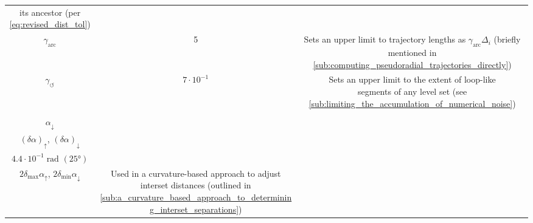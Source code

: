 \begin{table}[htpb]
\begin{tabular}{ccc}
{        its ancestor (per \cref{eq:revised_dist_tol})}
        \\[9pt]
        $\gamma_{\text{arc}}$ %
        & 5 %
        & \makecell{Sets an upper limit to trajectory lengths as \\
        $\gamma_{\text{arc}}\Delta_{i}$ (briefly mentioned in
        \cref{sub:computing_pseudoradial_trajectories_directly})}
        \\[9pt]
        $\gamma_{\circlearrowleft}$ %
        & $7\cdot10^{-1}$
        & \makecell{Sets an upper limit to the extent of loop-like\\
        segments of any level set (see
        \cref{sub:limiting_the_accumulation_of_numerical_noise})}
        \\[9pt]
        \makecell[c]{$\alpha_{\uparrow}$\\ $\alpha_{\downarrow}$ \\[1.5pt]%
        ${(\delta\alpha)}_{\uparrow}$, ${(\delta\alpha)}_{\downarrow}$} &
        \makecell[c]{$8.7\cdot10^{-2}\;\si{\radian}$ \phantom{2}$(5\si{\degree})$\\ %
            $4.4\cdot10^{-1}\;\si{\radian}$ $(25\si{\degree})$\\[1.5pt]%
        $2\delta_{\max}\alpha_{\uparrow}$, $2\delta_{\min}\alpha_{\downarrow}$}%
        & \makecell[c]{Used in a curvature-based approach to adjust\\
        interset distances (outlined in
        \cref{sub:a_curvature_based_approach_to_determining_interset_separations})}
        \\[18pt]
        \bottomrule
    \end{tabular}
\end{table}

